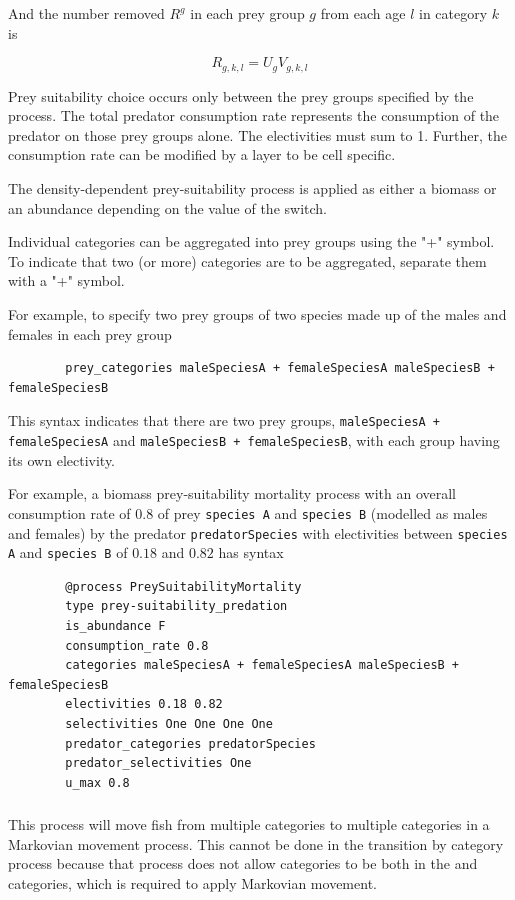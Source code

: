 And the number removed $R^g$ in each prey group $g$ from each age $l$ in category $k$ is

\begin{equation}
R_{g,k,l} = U_g V_{g,k,l}
\end{equation}

Prey suitability choice occurs only between the prey groups specified by the process. The total predator consumption rate represents the consumption of the predator on those prey groups alone. The electivities must sum to 1. Further, the consumption rate can be modified by a layer to be cell specific.

The density-dependent prey-suitability process is applied as either a biomass or an abundance depending on the value of the  switch.

Individual categories can be aggregated into prey groups using the "+" symbol. To indicate that two (or more) categories are to be aggregated, separate them with a "+" symbol.

For example, to specify two prey groups of two species made up of the males and females in each prey group

{\small{\begin{verbatim}
		prey_categories maleSpeciesA + femaleSpeciesA maleSpeciesB + femaleSpeciesB
\end{verbatim}}}

This syntax indicates that there are two prey groups, \texttt{maleSpeciesA + femaleSpeciesA} and \texttt{maleSpeciesB + femaleSpeciesB}, with each group having its own electivity.

For example, a biomass prey-suitability mortality process with an overall consumption rate of $0.8$ of prey \texttt{species A} and \texttt{species B} (modelled as males and females) by the predator \texttt{predatorSpecies} with electivities between \texttt{species A} and \texttt{species B} of $0.18$ and $0.82$ has syntax

{\small{\begin{verbatim}
		@process PreySuitabilityMortality
		type prey-suitability_predation
		is_abundance F
		consumption_rate 0.8
		categories maleSpeciesA + femaleSpeciesA maleSpeciesB + femaleSpeciesB
		electivities 0.18 0.82
		selectivities One One One One
		predator_categories predatorSpecies
		predator_selectivities One
		u_max 0.8
\end{verbatim}}}

\subsubsection{}\label{sec:Process-MarkovianMovement}
This process will move fish from multiple categories to multiple categories in a Markovian movement process. This cannot be done in the transition by category process because that process does not allow categories to be both in the  and  categories, which is required to apply Markovian movement.

